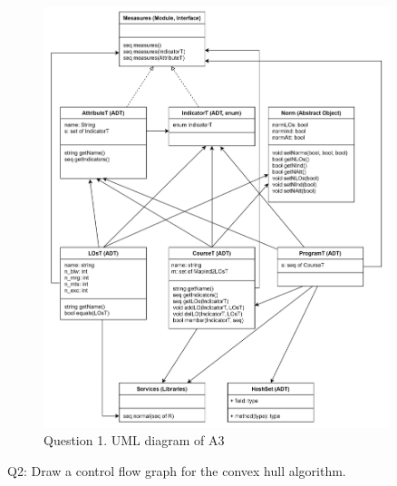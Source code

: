 \documentclass[12pt]{article}
\begin{document}
\begin{figure}[h!]
  \centering
  \includegraphics[width=0.9\textwidth]{Figures/A3UML.png}
  \caption{Question 1. UML diagram of A3}
\end{figure}

\medskip

\noindent Q2:  Draw a control flow graph for the convex hull algorithm.\\
\end{document}
